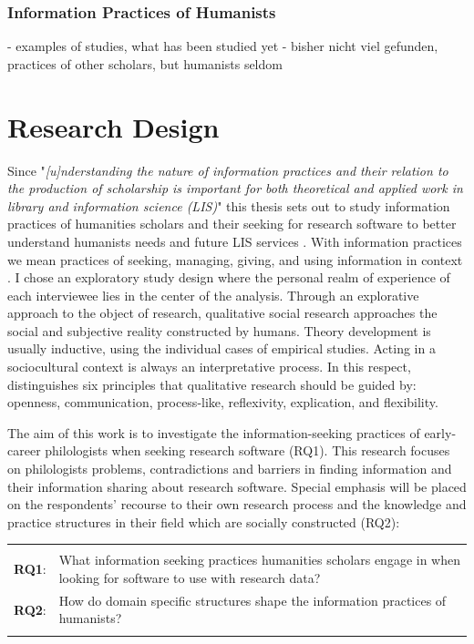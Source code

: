 \documentclass[12pt,a4paper,titlepage,oneside,abstract=true,toc=listof,toc=bibliography]{scrreprt}
\begin{document}
\subsection{Information Practices of Humanists}
- examples of studies, what has been studied yet
- bisher nicht viel gefunden, practices of other scholars, but humanists seldom
	
\chapter{Research Design}
Since "\textit{[u]nderstanding the nature of information practices and their relation to the production of scholarship is important for both theoretical and applied work in library and information science (LIS)}" \citep[p. 165]{Palmer2009} this thesis sets out to study information practices of humanities scholars and their seeking for research software to better understand humanists needs and future LIS services \citep{Case2008, Cunningham2010}. With information practices we mean practices of seeking, managing, giving, and using information in context \citep{Palmer2009}. I chose an exploratory study design \citep{Rinsdorf2013} where the personal realm of experience of each interviewee lies in the center of the analysis. Through an explorative approach to the object of research, qualitative social research approaches the social and subjective reality constructed by humans. Theory development is usually inductive, using the individual cases of empirical studies. Acting in a sociocultural context is always an interpretative process. In this respect, \citet[p. 20ff]{Lamnek2005} distinguishes six principles that qualitative research should be guided by: openness, communication, process-like, reflexivity, explication, and flexibility.

The aim of this work is to investigate the information-seeking practices of early-career philologists when seeking research software (RQ1). This research focuses on philologists problems, contradictions and barriers in finding information and their information sharing about research software. Special emphasis will be placed on the respondents' recourse to their own research process and the knowledge and practice structures in their field \citep{Hjorland1995} which are socially constructed (RQ2):

\begin{tabular}{p{2cm}p{12cm}}
& \\
\textbf{RQ1}: & What information seeking practices humanities scholars engage in when looking for software to use with research data? \\ 
\textbf{RQ2}: & How do domain specific structures shape the information practices of humanists? \\ 
& \\
\end{tabular}\\  
\end{document}
